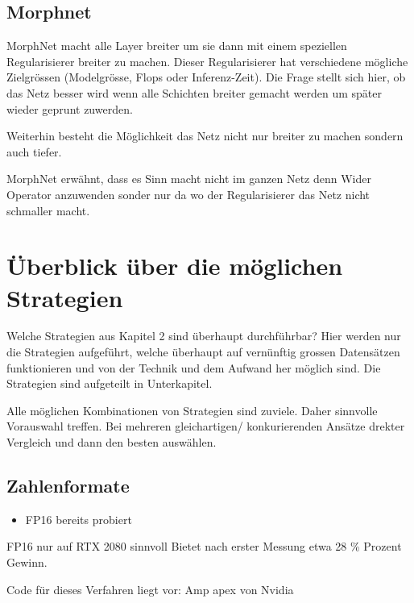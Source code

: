 \subsection{Morphnet}
MorphNet macht alle Layer breiter um sie dann mit einem speziellen Regularisierer breiter zu machen. Dieser Regularisierer hat verschiedene mögliche Zielgrössen (Modelgrösse, Flops oder Inferenz-Zeit).
Die Frage stellt sich hier, ob das Netz besser wird wenn alle Schichten breiter gemacht werden um später wieder geprunt zuwerden.

Weiterhin besteht die Möglichkeit das Netz nicht nur breiter zu machen sondern auch tiefer.


MorphNet erwähnt, dass es Sinn macht nicht im ganzen Netz denn Wider Operator anzuwenden sonder nur da wo der Regularisierer das Netz nicht schmaller macht.


\section{Überblick über die möglichen Strategien}

Welche Strategien aus Kapitel 2 sind überhaupt durchführbar?
Hier werden nur die Strategien aufgeführt, welche überhaupt auf vernünftig grossen Datensätzen funktionieren und von der Technik und dem Aufwand her möglich sind.
Die Strategien sind aufgeteilt in Unterkapitel. 

Alle möglichen Kombinationen von Strategien sind zuviele. Daher sinnvolle Vorauswahl treffen.  
Bei mehreren gleichartigen/ konkurierenden Ansätze drekter Vergleich und dann den besten auswählen.
\subsection{Zahlenformate}

\begin{itemize}
 \item FP16 bereits probiert
\end{itemize}


FP16 nur auf RTX 2080 sinnvoll
Bietet nach erster Messung etwa 28 \% Prozent Gewinn.

Code für dieses Verfahren liegt vor: Amp apex von Nvidia

